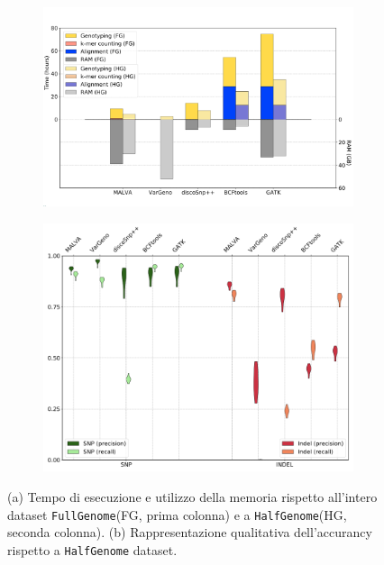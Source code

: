 \documentclass[../main.tex]{subfiles}
\begin{document}
\begin{figure}[h!]
	\centering
	\begin{subfigure}{.5\textwidth}
	  \centering
	  \includegraphics[width=\linewidth]{images/confronto1.png}
	  \caption{}
	  \label{fig:confronto1}
	\end{subfigure}%
	\begin{subfigure}{.5\textwidth}
	  \centering
	  \includegraphics[width=\linewidth]{images/confronto2.png}
	  \caption{}	  
	  \label{fig:confronto2}
	\end{subfigure}
	\caption{(a) Tempo di esecuzione e utilizzo della memoria rispetto all'intero dataset \texttt{FullGenome}(FG, prima colonna) e a \texttt{HalfGenome}(HG, seconda colonna). (b) Rappresentazione qualitativa dell'accurancy rispetto a \texttt{HalfGenome} dataset.}
\end{figure}
\end{document}
